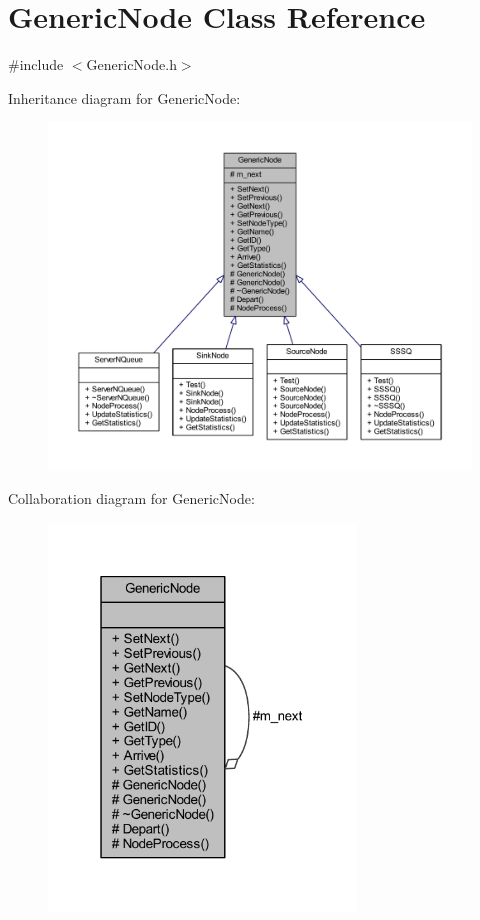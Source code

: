 \hypertarget{class_generic_node}{}\section{Generic\+Node Class Reference}
\label{class_generic_node}


{\ttfamily \#include $<$Generic\+Node.\+h$>$}



Inheritance diagram for Generic\+Node\+:
\nopagebreak
\begin{figure}[H]
\begin{center}
\leavevmode
\includegraphics[width=350pt]{class_generic_node__inherit__graph}
\end{center}
\end{figure}


Collaboration diagram for Generic\+Node\+:
\nopagebreak
\begin{figure}[H]
\begin{center}
\leavevmode
\includegraphics[width=232pt]{class_generic_node__coll__graph}
\end{center}
\end{figure}
